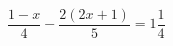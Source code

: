 \begin{ex}[type=equation]
	\begin{condition}
		$\dfrac{1-x}{4}-\dfrac{2(2x + 1)}{5} = 1\dfrac{1}{4}$
	\end{condition}
\end{ex}